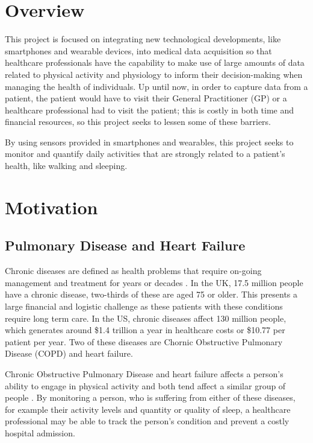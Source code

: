 

    \chapter{Overview}

        This project is focused on integrating new technological developments, like smartphones and wearable devices, into medical data acquisition so that healthcare professionals have the capability to make use of large amounts of data related to physical activity and physiology to inform their decision-making when managing the health of individuals. Up until now, in order to capture data from a patient, the patient would have to visit their General Practitioner (GP) or a healthcare professional had to visit the patient; this is costly in both time and financial resources, so this project seeks to lessen some of these barriers. 

        By using sensors provided in smartphones and wearables, this project seeks to monitor and quantify daily activities that are strongly related to a patient's health, like walking and sleeping.

    \chapter{Motivation}

        \section{Pulmonary Disease and Heart Failure}

            Chronic diseases are defined as health problems that require on-going management and treatment for years or decades \cite{chronic_diseases}. In the UK, 17.5 million people have a chronic disease, two-thirds of these are aged 75 or older. This presents a large financial and logistic challenge as these patients with these conditions require long term care. In the US, chronic diseases affect 130 million people, which generates around \$1.4 trillion a year in healthcare costs \cite{chronic_diseases} or \$10.77 per patient per year. Two of these diseases are Chornic Obstructive Pulmonary Disease (COPD) and heart failure. 

            Chronic Obstructive Pulmonary Disease and heart failure affects a person's ability to engage in physical activity and both tend affect a similar group of people \cite{copd_nhs, heart_failure_stats}. By monitoring a person, who is suffering from either of these diseases, for example their activity levels and quantity or quality of sleep, a healthcare professional may be able to track the person's condition and prevent a costly hospital admission.

